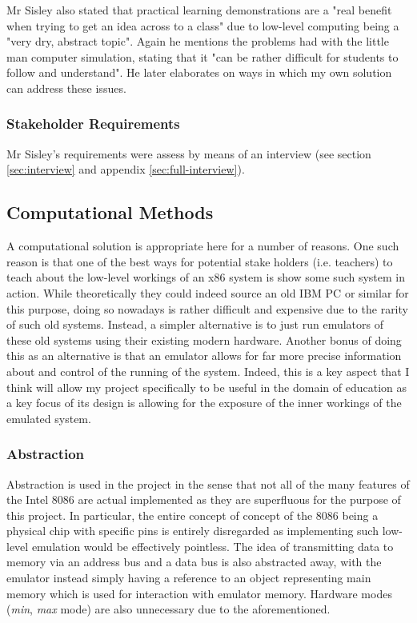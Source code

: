         Mr Sisley also stated that practical learning demonstrations are a "real benefit when trying to get an idea across to a class" due to low-level computing being a "very dry, abstract topic". Again he mentions the problems had with the little man computer simulation, stating that it "can be rather difficult for students to follow and understand". He later elaborates on ways in which my own solution can address these issues.

    \subsubsection{Stakeholder Requirements}
        Mr Sisley's requirements were assess by means of an interview (see section \ref{sec:interview} and appendix \ref{sec:full-interview}).

\subsection{Computational Methods}
    A computational solution is appropriate here for a number of reasons. One such reason is that one of the best ways for potential stake holders (i.e. teachers) to teach about the low-level workings of an x86 system is show some such system in action. While theoretically they could indeed source an old IBM PC or similar for this purpose, doing so nowadays is rather difficult and expensive due to the rarity of such old systems. Instead, a simpler alternative is to just run emulators of these old systems using their existing modern hardware. Another bonus of doing this as an alternative is that an emulator allows for far more precise information about and control of the running of the system. Indeed, this is a key aspect that I think will allow my project specifically to be useful in the domain of education as a key focus of its design is allowing for the exposure of the inner workings of the emulated system.

    \subsubsection{Abstraction}
        Abstraction is used in the project in the sense that not all of the many features of the Intel 8086 are actual implemented as they are superfluous for the purpose of this project. In particular, the entire concept of concept of the 8086 being a physical chip with specific pins is entirely disregarded as implementing such low-level emulation would be effectively pointless. The idea of transmitting data to memory via an address bus and a data bus is also abstracted away, with the emulator instead simply having a reference to an object representing main memory which is used for interaction with emulator memory. Hardware modes (\textit{min}, \textit{max} mode) are also unnecessary due to the aforementioned.


